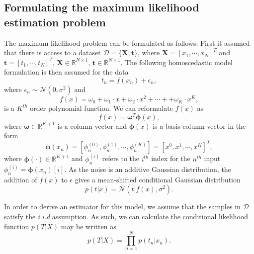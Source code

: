 \documentclass{article}
\begin{document}
\subsection{Formulating the maximum likelihood estimation problem}

The maximum likelihood problem can be formulated as follows: First it assumed that there is access to a dataset $\mathcal{D} = \{ \mathbf{X}, \mathbf{t}\}$, where $\mathbf{X} = [x_1, \cdots, x_N]^T$ and $\mathbf{t} = [t_1, \cdots, t_N]^T$, $\mathbf{X} \in \mathbb{R}^{N \times 1}$, $\mathbf{t} \in \mathbb{R}^{N \times 1}$. The following homoscedastic model formulation is then assumed for the data
\begin{equation}
t_n = f(x_n) + \epsilon_n,
\end{equation}
where $\epsilon_n \sim \mathcal{N}(0, \sigma^2)$ and
\begin{equation}
f(x) = \omega_0 + \omega_1 \cdot x + \omega_2 \cdot x^2 + \cdots +  + \omega_K \cdot x^K,
\end{equation}
is a $K^{th}$ order polynomial function. We can reformulate $f(x)$ as
\begin{equation}
f(x) = \boldsymbol\omega^T \boldsymbol\phi(x),
\end{equation}
where $\boldsymbol\omega \in \mathbb{R}^{K + 1}$ is a column vector and $\boldsymbol\phi(x)$ is a basis column vector in the form
\begin{equation}
\boldsymbol\phi(x_n) = [\phi_{n}^{(0)}, \phi_{n}^{(1)}, \cdots, \phi_{n}^{(K)}]= [x^{0}, x^{1}, \cdots, x^{K}]^T,
\end{equation}
where $\boldsymbol\phi(\cdot) \in \mathbb{R}^{K + 1}$ and $\phi_{n}^{(i)}$ refers to the $i^{th}$ index for the $n^{th}$ input $\phi_{n}^{(i)} = \boldsymbol\phi(x_n)[i]$. As the noise is an additive Gaussian distribution, the addition of $f(x)$ to $\epsilon$ gives a mean-shifted conditional Gaussian distribution
\begin{equation}
p(t\vert x) = \mathcal{N}(t \vert f(x), \sigma^2).
\end{equation}

In order to derive an estimator for this model, we assume that the samples in $\mathcal{D}$ satisfy the \emph{i.i.d} assumption. As such, we can calculate the conditional likelihood function $p(T \vert X)$ may be written as
\begin{equation}
p(T \vert X) = \prod_{n=1}^{N} p(t_n \vert x_n).
\end{equation}
\end{document}
